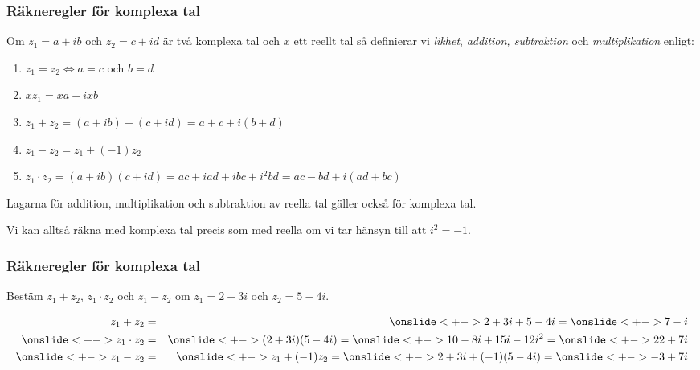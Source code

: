 \documentclass[slidestop,blue,handout,9pt]{beamer}
\begin{document}
\begin{frame}
\frametitle{Räkneregler för komplexa tal}

\begin{definition}[Räkneregler]
Om $z_1 = a + ib$ och $z_2 = c + id$ är två komplexa tal och $x$ ett
reellt tal så definierar vi \emph{likhet}, \emph{addition, subtraktion}
och \emph{multiplikation} enligt:

\begin{enumerate}
\item  $z_1 = z_2 \Leftrightarrow a = c$ och $b = d$

\item  $xz_1 = xa + ixb$

\item  $z_1 + z_2 = (a + ib) + (c + id) = a + c + i(b + d)$

\item  $z_1 - z_2 = z_1 + (-1)z_2$

\item  $z_1\cdot z_2 = (a+ib)(c+id) = ac + iad + ibc + i^2bd 
                     = ac - bd + i(ad + bc)$
\end{enumerate}
\end{definition}
\begin{sats}
Lagarna för addition, multiplikation och subtraktion av reella tal gäller 
också för komplexa tal.
\end{sats}
\begin{anm}
Vi kan alltså räkna med komplexa tal precis som med reella om vi
tar hänsyn till att $i^2 = -1.$
\end{anm}
\end{frame}


\begin{frame}
\frametitle{Räkneregler för komplexa tal}
\begin{exempel}
Bestäm $z_1 + z_2$, $z_1\cdot z_2$ och $z_1 - z_2$ om $z_1 = 2 + 3i$ och $z_2 = 5 - 4i$.
 \onslide<+->
\begin{losning}
\begin{eqnarray*}
z_1 + z_2 & =& \onslide<+->  2 + 3i + 5 - 4i = \onslide<+->7-i \\
\onslide<+->
z_1\cdot z_2    & =& \onslide<+-> (2 + 3i)(5 - 4i) 
= \onslide<+-> 10 - 8i + 15i - 12i^2 = \onslide<+-> 22 + 7i \\
\onslide<+->
z_1 - z_2 & =& \onslide<+->z_1 + (-1)z_2 = \onslide<+->2 + 3i + (-1)(5 - 4i) = \onslide<+->-3+7i
\end{eqnarray*}
\end{losning}
\end{exempel}
\end{frame}
\end{document}
